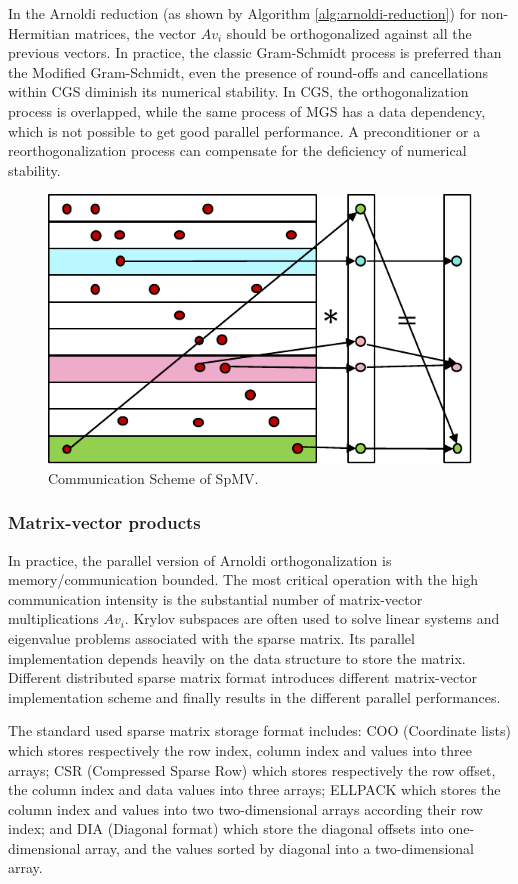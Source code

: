 {In the Arnoldi reduction (as shown by Algorithm \ref{alg:arnoldi-reduction}) for non-Hermitian matrices, the vector $Av_i$ should be orthogonalized against all the previous vectors. In practice, the classic Gram-Schmidt process is preferred than the Modified Gram-Schmidt, even the presence of round-offs and cancellations within CGS diminish its numerical stability. In CGS, the orthogonalization process is overlapped, while the same process of MGS has a data dependency, which is not possible to get good parallel performance. A preconditioner or a reorthogonalization process can compensate for the deficiency of numerical stability.

\begin{figure}[h]
	\centering
	\includegraphics[width=4.8in]{fig/spmv.pdf}
	\caption{Communication Scheme of SpMV.}
	\label{fig:spmv}
\end{figure}

\subsubsection{Matrix-vector products}

In practice, the parallel version of Arnoldi orthogonalization is memory/communication bounded. The most critical operation with the high communication intensity is the substantial number of matrix-vector multiplications $Av_i$. Krylov subspaces are often used to solve linear systems and eigenvalue problems associated with the sparse matrix. Its parallel implementation depends heavily on the data structure to store the matrix. Different distributed sparse matrix format introduces different matrix-vector implementation scheme and finally results in the different parallel performances.

The standard used sparse matrix storage format includes: COO (Coordinate lists) which stores respectively the row index, column index and values into three arrays; CSR (Compressed Sparse Row) which stores respectively the row offset, the column index and data values into three arrays; ELLPACK which stores the column index and values into two two-dimensional arrays according their row index; and DIA (Diagonal format) which store the diagonal offsets into one-dimensional array, and the values sorted by diagonal into a two-dimensional array.

}
